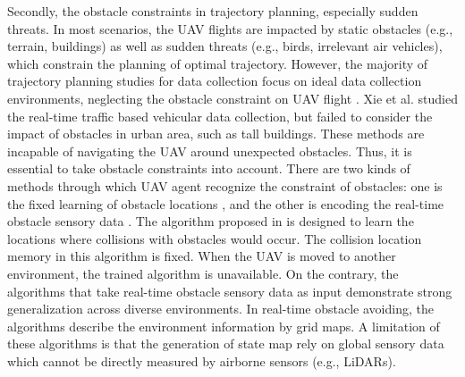 \documentclass[conference]{IEEEtran}
\begin{document}
Secondly, the obstacle constraints in trajectory planning, especially sudden threats. In most scenarios, the UAV flights are impacted by static obstacles (e.g., terrain, buildings) as well as sudden threats (e.g., birds, irrelevant air vehicles), which constrain the planning of optimal trajectory. However, the majority of trajectory planning studies for data collection focus on ideal data collection environments, neglecting the obstacle constraint on UAV flight \cite{JLi20,TWang22,MLi23,XXie23,Rahim23}. Xie et al. \cite{XXie23} studied the real-time traffic based vehicular data collection, but failed to consider the impact of obstacles in urban area, such as tall buildings. These methods are incapable of navigating the UAV around unexpected obstacles. Thus, it is essential to take obstacle constraints into account. There are two kinds of methods through which UAV agent recognize the constraint of obstacles: one is the fixed learning of obstacle locations \cite{XWang22}, and the other is encoding the real-time obstacle sensory data \cite{ZDai23,Khodaparast21}. The algorithm proposed in \cite{XWang22} is designed to learn the locations where collisions with obstacles would occur. The collision location memory in this algorithm is fixed. When the UAV is moved to another environment, the trained algorithm is unavailable. On the contrary, the algorithms that take real-time obstacle sensory data as input demonstrate strong generalization across diverse environments. In real-time obstacle avoiding, the algorithms \cite{ZDai23,Bayerlein21} describe the environment information by grid maps. A limitation of these algorithms is that the generation of state map rely on global sensory data which cannot be directly measured by airborne sensors (e.g., LiDARs). 

\end{document}
